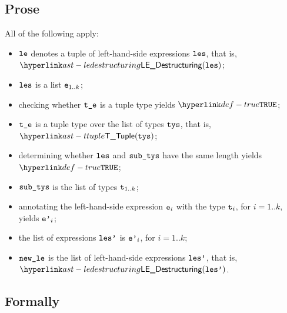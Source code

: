 \subsection{Prose}
All of the following apply:
\begin{itemize}
  \item $\vle$ denotes a tuple of left-hand-side expressions $\les$, that is, $\LEDestructuring(\les)$;
  \item $\les$ is a list $\ve_{1..k}$;
  \item checking whether $\vte$ is a tuple type yields $\True$\ProseTerminateAs{\ExpectedTupleType};
  \item $\vte$ is a tuple type over the list of types $\tys$, that is, $\TTuple(\tys)$;
  \item determining whether $\les$ and $\subtys$ have the same length yields $\True$\ProseTerminateAs{\LengthsMismatch};
  \item $\subtys$ is the list of types $\vt_{1..k}$;
  \item annotating the left-hand-side expression $\ve_i$ with the type $\vt_i$, for $i=1..k$, yields $\vep_i$\ProseOrTypeError;
  \item the list of expressions $\lesp$ is $\vep_i$, for $i=1..k$;
  \item $\newle$ is the list of left-hand-side expressions $\lesp$, that is, $\LEDestructuring(\lesp)$.
\end{itemize}



\subsection{Formally}
\begin{mathpar}
\end{mathpar}

